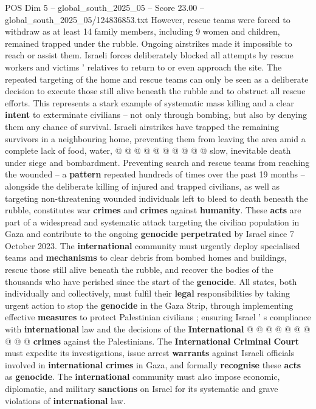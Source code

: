 \begin{textsample}{POS Dim 5 – global\_south\_2025\_05 – Score 23.00 – global\_south\_2025\_05/124836853.txt}
However, rescue teams were forced to withdraw as at least 14 family members, including 9 women and children, remained trapped under the rubble.
Ongoing airstrikes made it impossible to reach or assist them.
Israeli forces deliberately blocked all attempts by rescue workers and victims ' relatives to return to or even approach the site.
The repeated targeting of the home and rescue teams can only be seen as a deliberate decision to execute those still alive beneath the rubble and to obstruct all rescue efforts.
This represents a stark example of systematic mass killing and a clear \textbf{intent} to exterminate civilians -- not only through bombing, but also by denying them any chance of survival.
Israeli airstrikes have trapped the remaining survivors in a neighbouring home, preventing them from leaving the area amid a complete lack of food, water, @ @ @ @ @ @ @ @ @ @ slow, inevitable death under siege and bombardment.
Preventing search and rescue teams from reaching the wounded -- a \textbf{pattern} repeated hundreds of times over the past 19 months -- alongside the deliberate killing of injured and trapped civilians, as well as targeting non-threatening wounded individuals left to bleed to death beneath the rubble, constitutes war \textbf{crimes} and \textbf{crimes} against \textbf{humanity}.
These \textbf{acts} are part of a widespread and systematic attack targeting the civilian population in Gaza and contribute to the ongoing \textbf{genocide} \textbf{perpetrated} by Israel since 7 October 2023.
The \textbf{international} community must urgently deploy specialised teams and \textbf{mechanisms} to clear debris from bombed homes and buildings, rescue those still alive beneath the rubble, and recover the bodies of the thousands who have perished since the start of the \textbf{genocide}.
All states, both individually and collectively, must fulfil their \textbf{legal} responsibilities by taking urgent action to stop the \textbf{genocide} in the Gaza Strip, through implementing effective \textbf{measures} to protect Palestinian civilians ; ensuring Israel ' s compliance with \textbf{international} law and the decisions of the \textbf{International} @ @ @ @ @ @ @ @ @ @ \textbf{crimes} against the Palestinians.
The \textbf{International} \textbf{Criminal} \textbf{Court} must expedite its investigations, issue arrest \textbf{warrants} against Israeli officials involved in \textbf{international} \textbf{crimes} in Gaza, and formally \textbf{recognise} these \textbf{acts} as \textbf{genocide}.
The \textbf{international} community must also impose economic, diplomatic, and military \textbf{sanctions} on Israel for its systematic and grave violations of \textbf{international} law.

\end{textsample}
